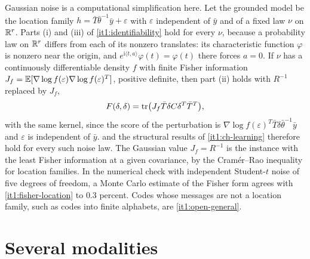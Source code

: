 \documentclass[11pt,letterpaper]{report}
\begin{document}
Gaussian noise is a computational simplification here. Let the grounded model be the location family $h=\bar T\bar\theta^{-1}\bar y+\varepsilon$ with $\varepsilon$ independent of $\bar y$ and of a fixed law $\nu$ on $\mathbb R^r$. Parts (i) and (iii) of \cref{it1:identifiability} hold for every $\nu$, because a probability law on $\mathbb R^r$ differs from each of its nonzero translates: its characteristic function $\varphi$ is nonzero near the origin, and $e^{\mathrm i\langle t,a\rangle}\varphi(t)=\varphi(t)$ there forces $a=0$. If $\nu$ has a continuously differentiable density $f$ with finite Fisher information $J_f=\mathbb E[\nabla\log f(\varepsilon)\nabla\log f(\varepsilon)^T]$, positive definite, then part (ii) holds with $R^{-1}$ replaced by $J_f$,
\begin{equation}
F(\delta,\delta)=\operatorname{tr}\bigl(J_f\bar T\delta C\delta^T\bar T^T\bigr),
\label{it1:fisher-location}
\end{equation}
with the same kernel, since the score of the perturbation is $\nabla\log f(\varepsilon)^T\bar T\delta\bar\theta^{-1}\bar y$ and $\varepsilon$ is independent of $\bar y$.  and the structural results of \cref{it1:ch-learning} therefore hold for every such noise law. The Gaussian value $J_f=R^{-1}$ is the instance with the least Fisher information at a given covariance, by the Cram\'er--Rao inequality for location families. In the numerical check with independent Student-$t$ noise of five degrees of freedom, a Monte Carlo estimate of the Fisher form agrees with \cref{it1:fisher-location} to $0.3$ percent. Codes whose messages are not a location family, such as codes into finite alphabets, are \cref{it1:open-general}.

\chapter{Several modalities}
\label{it1:ch-modalities}
\end{document}

